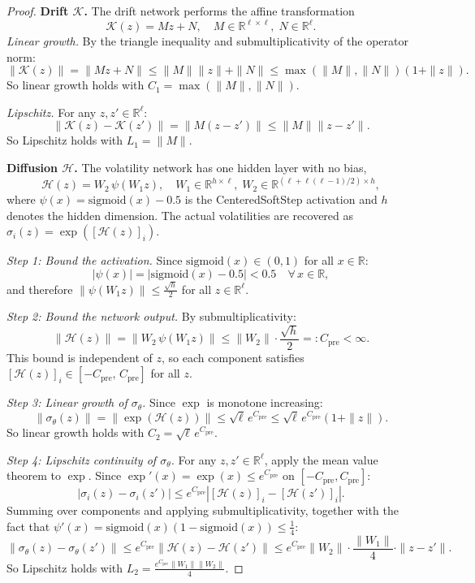 \begin{proof}
\textbf{Drift $\mathcal{K}$.}
The drift network performs the affine transformation
\[
\mathcal{K}(z) = Mz + N, \quad M \in \mathbb{R}^{\ell \times \ell},\; N \in \mathbb{R}^\ell.
\]
\emph{Linear growth.} By the triangle inequality and submultiplicativity of the operator norm:
\[
\|\mathcal{K}(z)\| = \|Mz + N\| \leq \|M\|\|z\| + \|N\| \leq \max(\|M\|, \|N\|)(1 + \|z\|).
\]
So linear growth holds with $C_1 = \max(\|M\|, \|N\|)$.

\emph{Lipschitz.} For any $z, z' \in \mathbb{R}^\ell$:
\[
\|\mathcal{K}(z) - \mathcal{K}(z')\| = \|M(z - z')\| \leq \|M\|\|z - z'\|.
\]
So Lipschitz holds with $L_1 = \|M\|$.

\textbf{Diffusion $\mathcal{H}$.}
The volatility network has one hidden layer with no bias,
\[
\mathcal{H}(z) = W_2\,\psi(W_1 z), \quad 
W_1 \in \mathbb{R}^{h \times \ell},\; 
W_2 \in \mathbb{R}^{(\ell + \ell(\ell-1)/2) \times h},
\]
where $\psi(x) = \mathrm{sigmoid}(x) - 0.5$ is the CenteredSoftStep activation 
and $h$ denotes the hidden dimension. The actual volatilities are recovered as 
$\sigma_i(z) = \exp([\mathcal{H}(z)]_i)$.

\emph{Step 1: Bound the activation.} Since $\mathrm{sigmoid}(x) \in (0,1)$ for all 
$x \in \mathbb{R}$:
\[
|\psi(x)| = |\mathrm{sigmoid}(x) - 0.5| < 0.5 \quad \forall\, x \in \mathbb{R},
\]
and therefore $\|\psi(W_1 z)\| \leq \frac{\sqrt{h}}{2}$ for all $z \in \mathbb{R}^\ell$.

\emph{Step 2: Bound the network output.} By submultiplicativity:
\[
\|\mathcal{H}(z)\| = \|W_2\,\psi(W_1 z)\| \leq \|W_2\|\cdot\frac{\sqrt{h}}{2} 
=: C_{\mathrm{pre}} < \infty.
\]
This bound is independent of $z$, so each component satisfies 
$[\mathcal{H}(z)]_i \in [-C_{\mathrm{pre}},\, C_{\mathrm{pre}}]$ for all $z$.

\emph{Step 3: Linear growth of $\sigma_\theta$.} Since $\exp$ is monotone increasing:
\[
\|\sigma_\theta(z)\| = \bigl\|\exp(\mathcal{H}(z))\bigr\| 
\leq \sqrt{\ell}\,e^{C_{\mathrm{pre}}} 
\leq \sqrt{\ell}\,e^{C_{\mathrm{pre}}}(1 + \|z\|).
\]
So linear growth holds with $C_2 = \sqrt{\ell}\,e^{C_{\mathrm{pre}}}$.

\emph{Step 4: Lipschitz continuity of $\sigma_\theta$.} For any $z, z' \in \mathbb{R}^\ell$, 
apply the mean value theorem to $\exp$. Since 
$\exp'(x) = \exp(x) \leq e^{C_{\mathrm{pre}}}$ on $[-C_{\mathrm{pre}}, C_{\mathrm{pre}}]$:
\[
|\sigma_i(z) - \sigma_i(z')| \leq e^{C_{\mathrm{pre}}}|[\mathcal{H}(z)]_i - [\mathcal{H}(z')]_i|.
\]
Summing over components and applying submultiplicativity, together with the fact that 
$\psi'(x) = \mathrm{sigmoid}(x)(1 - \mathrm{sigmoid}(x)) \leq \frac{1}{4}$:
\[
\|\sigma_\theta(z) - \sigma_\theta(z')\| 
\leq e^{C_{\mathrm{pre}}}\|\mathcal{H}(z) - \mathcal{H}(z')\| 
\leq e^{C_{\mathrm{pre}}}\|W_2\|\cdot\frac{\|W_1\|}{4}\cdot\|z - z'\|.
\]
So Lipschitz holds with $L_2 = \frac{e^{C_{\mathrm{pre}}}\|W_1\|\|W_2\|}{4}$.


\end{proof}
